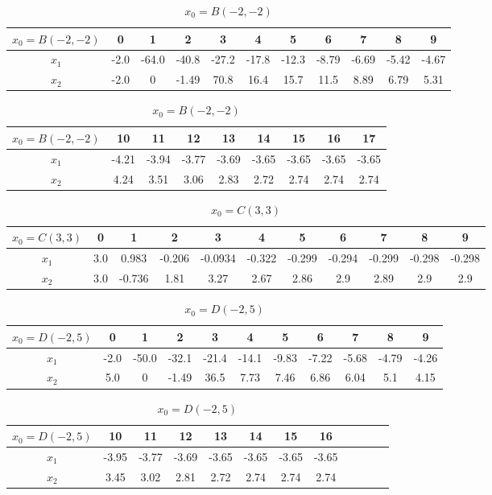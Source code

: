 \begin{table}[H]
\centering
\setlength{\abovecaptionskip}{0cm} 
\setlength{\belowcaptionskip}{-0.5cm}
\scriptsize
\begin{tabular}{|c|c|c|c|c|c|c|c|c|c|c|}
\hline
$x_0=B(-2,-2)$&0&1&2&3&4&5&6&7&8&9\\
\hline
$x_1$&-2.0 & -64.0 & -40.8 & -27.2 & -17.8 & -12.3 & -8.79 & -6.69 & -5.42 & -4.67  \\
\hline
$x_2$&-2.0 & 0 & -1.49 & 70.8 & 16.4 & 15.7 & 11.5 & 8.89 & 6.79 & 5.31   
\\
\hline
\end{tabular}

\begin{tabular}{|c|c|c|c|c|c|c|c|c|}
\hline
$x_0=B(-2,-2)$&10&11&12&13&14&15&16&17\\
\hline
$x_1$&-4.21 & -3.94 & -3.77 & -3.69 & -3.65 & -3.65 & -3.65 & -3.65  \\
\hline
$x_2$&4.24 & 3.51 & 3.06 & 2.83 & 2.72 & 2.74 & 2.74 & 2.74
\\
\hline
\end{tabular}

\caption{$x_0=B(-2,-2)$}
\end{table}
\begin{table}[H]
\centering
\setlength{\abovecaptionskip}{0cm} 
\setlength{\belowcaptionskip}{-0.5cm}
\scriptsize
\begin{tabular}{|c|c|c|c|c|c|c|c|c|c|c|}
\hline
$x_0=C(3,3)$&0&1&2&3&4&5&6&7&8&9\\
\hline
$x_1$&3.0 & 0.983 & -0.206 & -0.0934 & -0.322 & -0.299 & -0.294 & -0.299 & -0.298 & -0.298 \\
\hline
$x_2$&3.0 & -0.736 & 1.81 & 3.27 & 2.67 & 2.86 & 2.9 & 2.89 & 2.9 & 2.9
\\
\hline
\end{tabular}

\caption{$x_0=C(3,3)$}
\end{table}
\begin{table}[H]
\centering
\setlength{\abovecaptionskip}{0cm} 
\setlength{\belowcaptionskip}{-0.5cm}
\scriptsize
\begin{tabular}{|c|c|c|c|c|c|c|c|c|c|c|}
\hline
$x_0=D(-2,5)$&0&1&2&3&4&5&6&7&8&9\\
\hline
$x_1$&-2.0 & -50.0 & -32.1 & -21.4 & -14.1 & -9.83 & -7.22 & -5.68 & -4.79 & -4.26  \\
\hline
$x_2$&5.0 & 0 & -1.49 & 36.5 & 7.73 & 7.46 & 6.86 & 6.04 & 5.1 & 4.15
\\
\hline
\end{tabular}
\begin{tabular}{|c|c|c|c|c|c|c|c|c|c|c|c|}
\hline
$x_0=D(-2,5)$&10&11&12&13&14&15&16\\
\hline
$x_1$ &-3.95 & -3.77 & -3.69 & -3.65 & -3.65 & -3.65 & -3.65\\
\hline
$x_2$&  3.45 & 3.02 & 2.81 & 2.72 & 2.74 & 2.74 & 2.74
\\
\hline

\end{tabular}
\caption{$x_0=D(-2,5)$}
\end{table}
